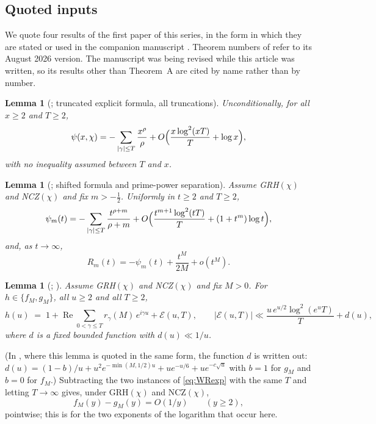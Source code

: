 \documentclass[11pt]{amsart}
\newtheorem{lemma}[theorem]{Lemma}
\theoremstyle{definition}
\numberwithin{equation}{section}
\newcommand{\cE}{\mathcal E}
\newcommand{\re}{\operatorname{Re}}
\begin{document}
\subsection{Quoted inputs}\label{subsec:quoted}
We quote four results of the first paper \cite{WR} of this series, in
the form in which they are stated or used in the companion
manuscript \cite{MC}. Theorem numbers of \cite{WR} refer to its
August 2026 version. The manuscript \cite{MC} was being revised while
this article was written, so its results other than Theorem~A are
cited by name rather than by number.

\begin{lemma}[{\cite[Lemma~1]{WR}}; truncated explicit formula, all
truncations]\label{lem:WRclassical}
Unconditionally, for all $x\ge2$ and $T\ge2$,
\[
\psi(x,\chi)=-\sum_{|\gamma|\le T}\frac{x^\rho}{\rho}
+O\Bigl(\frac{x\log^2(xT)}{T}+\log x\Bigr),
\]
with no inequality assumed between $T$ and $x$.
\end{lemma}

\begin{lemma}[{\cite[Lemmas~2 and~3]{WR}}; shifted formula and
prime-power separation]\label{lem:WRshift}
Assume GRH$(\chi)$ and NCZ$(\chi)$ and fix $m>-\tfrac12$. Uniformly in
$t\ge2$ and $T\ge2$,
\[
\psi_m(t)=-\sum_{|\gamma|\le T}\frac{t^{\rho+m}}{\rho+m}
+O\Bigl(\frac{t^{m+1}\log^2(tT)}{T}+(1+t^m)\log t\Bigr),
\]
and, as $t\to\infty$,
\[
R_m(t)=-\psi_m(t)+\frac{t^{M}}{2M}+o(t^{M}).
\]
\end{lemma}

\begin{lemma}[{\cite[proofs of Theorem~1(i) and of
Proposition~1]{WR}}; {\cite[Section ``Inputs quoted from the companion paper'']{MC}}]\label{lem:WRexp}
Assume GRH$(\chi)$ and NCZ$(\chi)$ and fix $M>0$. For
$h\in\{f_M,g_M\}$, all $u\ge2$ and all $T\ge2$,
\begin{equation}\label{eq:WRexp}
h(u)\;=\;1+\re\sum_{0<\gamma\le T}r_\gamma(M)\,e^{i\gamma u}
+\cE(u,T),\qquad
|\cE(u,T)|\ll\frac{u\,e^{u/2}\log^2(e^uT)}{T}+d(u),
\end{equation}
where $d$ is a fixed bounded function with $d(u)\ll1/u$.
\end{lemma}

(In \cite{MC}, where this lemma is quoted in the same form, the function $d$ is written out:
$d(u)=(1-b)/u+u^2e^{-\min(M,1/2)u}+ue^{-u/6}+ue^{-c\sqrt u}$ with
$b=1$ for $g_M$ and $b=0$ for $f_M$.) Subtracting the two instances
of \eqref{eq:WRexp} with the same $T$ and letting $T\to\infty$ gives,
under GRH$(\chi)$ and NCZ$(\chi)$,
\begin{equation}\label{eq:fminusg}
f_M(y)-g_M(y)=O(1/y)\qquad(y\ge2),
\end{equation}
pointwise; this is \cite[the theorem on logarithmic weights, part~(i)]{MC} for the two exponents of
the logarithm that occur here.
\end{document}
